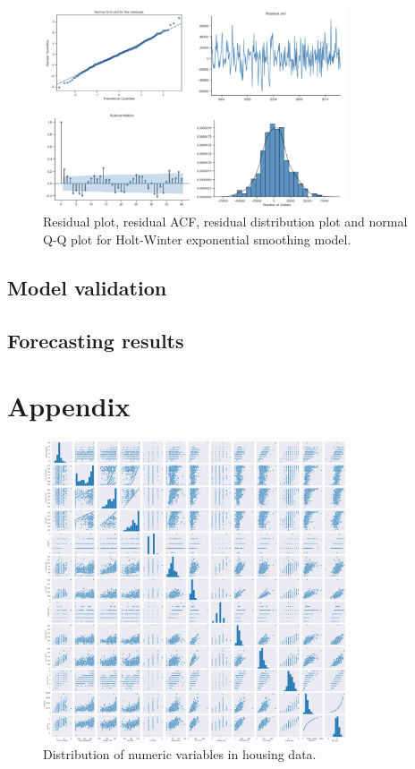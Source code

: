 \documentclass[letterpaper,12pt,twoside,]{pinp}
\begin{document}
\begin{figure}
\includegraphics[width=0.8\textwidth]{diagnostic_plot.png}
\centering
\caption{Residual plot, residual ACF, residual distribution plot and normal Q-Q plot for Holt-Winter exponential smoothing model.}
\label{fig:diagnostic_plot}
\end{figure}

\hypertarget{model-validation}{%
\subsection{Model validation}\label{model-validation}}

\hypertarget{forecasting-results}{%
\subsection{Forecasting results}\label{forecasting-results}}

\hypertarget{appendix}{%
\section{Appendix}\label{appendix}}

\begin{figure}
\includegraphics[width=0.8\textwidth]{scatter.png}
\centering
\caption{Distribution of numeric variables in housing data.}
\label{fig:scatter}
\end{figure}
\end{document}
